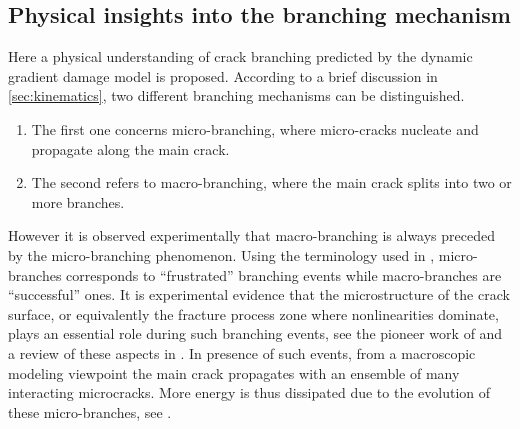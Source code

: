 \subsection{Physical insights into the branching mechanism} \label{sec:microbrachingstu}
Here a physical understanding of crack branching predicted by the dynamic gradient damage model is proposed. According to a brief discussion in \cref{sec:kinematics}, two different branching mechanisms can be distinguished.
\begin{enumerate}
\item The first one concerns micro-branching, where micro-cracks nucleate and propagate along the main crack.
\item The second refers to macro-branching, where the main crack splits into two or more branches.
\end{enumerate}
However it is observed experimentally that macro-branching is always preceded by the micro-branching phenomenon. Using the terminology used in \cite{SharonFineberg:1996}, micro-branches corresponds to ``frustrated'' branching events while macro-branches are ``successful'' ones. It is experimental evidence that the microstructure of the crack surface, or equivalently the fracture process zone where nonlinearities dominate, plays an essential role during such branching events, see the pioneer work of \cite{Ravi-ChandarKnauss:1984,Ravi-ChandarKnauss:1984a} and a review of these aspects in \cite{FinebergMarder:1999}. In presence of such events, from a macroscopic modeling viewpoint the main crack propagates with an ensemble of many interacting microcracks. More energy is thus dissipated due to the evolution of these micro-branches, see \cite{SharonGrossFineberg:1996}.

